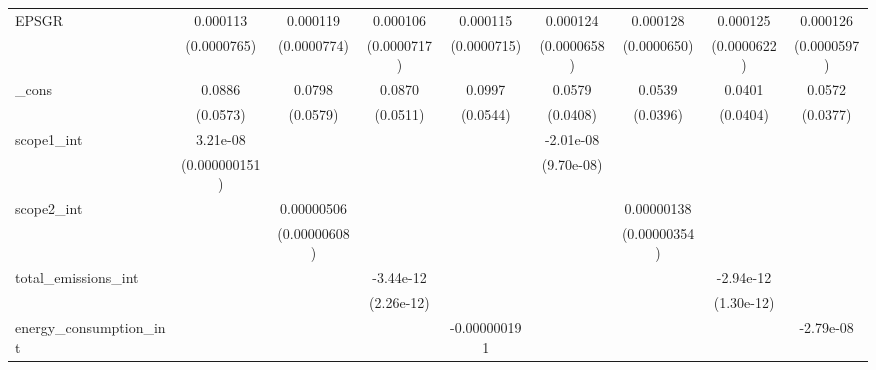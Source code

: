 \begin{table}[htbp]
\begin{tabular}{l*{8}{c}}
EPSGR               &    0.000113         &    0.000119         &    0.000106         &    0.000115         &    0.000124\sym{*}  &    0.000128\sym{*}  &    0.000125\sym{*}  &    0.000126\sym{*}  \\
                    & (0.0000765)         & (0.0000774)         & (0.0000717)         & (0.0000715)         & (0.0000658)         & (0.0000650)         & (0.0000622)         & (0.0000597)         \\
\_cons              &      0.0886         &      0.0798         &      0.0870         &      0.0997\sym{*}  &      0.0579         &      0.0539         &      0.0401         &      0.0572         \\
                    &    (0.0573)         &    (0.0579)         &    (0.0511)         &    (0.0544)         &    (0.0408)         &    (0.0396)         &    (0.0404)         &    (0.0377)         \\
scope1\_int          &    3.21e-08         &                     &                     &                     &   -2.01e-08         &                     &                     &                     \\
                    &(0.000000151)         &                     &                     &                     &  (9.70e-08)         &                     &                     &                     \\
scope2\_int          &                     &  0.00000506         &                     &                     &                     &  0.00000138         &                     &                     \\
                    &                     &(0.00000608)         &                     &                     &                     &(0.00000354)         &                     &                     \\
total\_emissions\_int &                     &                     &   -3.44e-12         &                     &                     &                     &   -2.94e-12\sym{**} &                     \\
                    &                     &                     &  (2.26e-12)         &                     &                     &                     &  (1.30e-12)         &                     \\
energy\_consumption\_int&                     &                     &                     &-0.000000191         &                     &                     &                     &   -2.79e-08         \\

\end{tabular}
\end{table}
